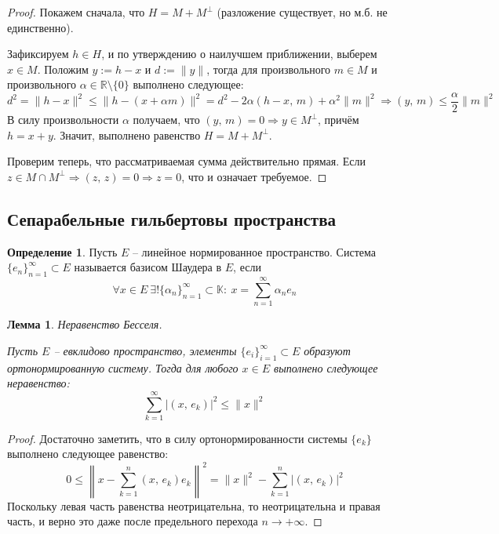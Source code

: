 \documentclass[a4paper,12pt]{article}
\renewcommand{\leq}{\ensuremath{\leqslant}}
\theoremstyle{plain}
\newtheorem{lemma}{Лемма}[section]
\theoremstyle{definition}
\newtheorem{definition}{Определение}[section]
\theoremstyle{remark}
\begin{document}
\begin{proof}
	Покажем сначала, что $H = M + M^\bot$ (разложение существует, но м.б. не единственно).

	Зафиксируем $h \in H$, и по утверждению о наилучшем приближении, выберем $x \in M$. Положим $y := h - x$ и $d := \|y\|$, тогда для произвольного $m \in M$ и произвольного $\alpha \in \mathbb{R}\setminus \{0\}$ выполнено следующее:
	\[
		d^2 = \|h - x\|^2 \leq \|h - (x + \alpha m)\|^2 = d^2 - 2\alpha(h - x,\, m) + \alpha^2\|m\|^2 \Rightarrow (y,\, m) \leq \frac{\alpha}{2}\|m\|^2
	\]
	В силу произвольности $\alpha$ получаем, что $(y,\, m) = 0 \Rightarrow y \in M^\bot$, причём $h = x+ y$. Значит, выполнено равенство $H = M + M^\bot$.

	Проверим теперь, что рассматриваемая сумма действительно прямая. Если $z \in M \cap M^\bot \Rightarrow (z,\,z) = 0 \Rightarrow z = 0$, что и означает требуемое.
\end{proof}

\subsection{Сепарабельные гильбертовы пространства}
\begin{definition}
	Пусть $E$ -- линейное нормированное пространство. Система $\{e_n\}_{n=1}^\infty \subset E$ называется базисом Шаудера в $E$, если
	\[
		\forall x \in E \: \exists! \{\alpha_n\}_{n = 1}^\infty \subset \mathbb{K} :\: x = \sum_{n = 1}^\infty \alpha_ne_n
	\]
\end{definition}

\begin{lemma}
	Неравенство Бесселя.

	Пусть $E$ -- евклидово пространство, элементы $\{e_i\}_{i=1}^\infty \subset E$ образуют ортонормированную систему. Тогда для любого $x \in E$ выполнено следующее неравенство:
	\[
		\sum_{k = 1}^\infty \vert(x,\, e_k)\vert^2 \leq \|x\|^2
	\]
\end{lemma}

\begin{proof}
	Достаточно заметить, что в силу ортонормированности системы $\{e_k\}$ выполнено следующее равенство:
	\[
		0 \leq \left\|x - \sum_{k = 1}^n (x,\, e_k)e_k\right\|^2 = \|x\|^2 - \sum_{k = 1}^n \vert(x,\, e_k)\vert^2
	\]
	Поскольку левая часть равенства неотрицательна, то неотрицательна и правая часть, и верно это даже после предельного перехода $n \to +\infty$.
\end{proof}
\end{document}

